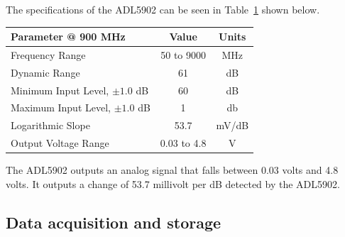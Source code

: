 The specifications of the ADL5902 can be seen in Table~\ref{data}
shown below.

\begin{table}[h!tb] \centering
{}
\label{data}
\begin{tabular}{lcc} \hline
\textbf{Parameter @ 900 MHz} & \textbf{Value} & \textbf{Units} \\ \hline
Frequency Range & 50 to 9000 & MHz \\
Dynamic Range & 61 & dB \\
Minimum Input Level, $\pm 1.0$ dB & 60 & dB \\ 
Maximum Input Level, $\pm 1.0$ dB & 1 & db \\
Logarithmic Slope & 53.7 & mV/dB \\ 
Output Voltage Range & 0.03 to 4.8 & V \\ \hline
\end{tabular}
\end{table}

The ADL5902 outputs an analog signal that falls between 0.03 volts and 4.8 volts.  It outputs a change of 53.7 millivolt per dB detected by the ADL5902.  




\subsection{Data acquisition and storage}

